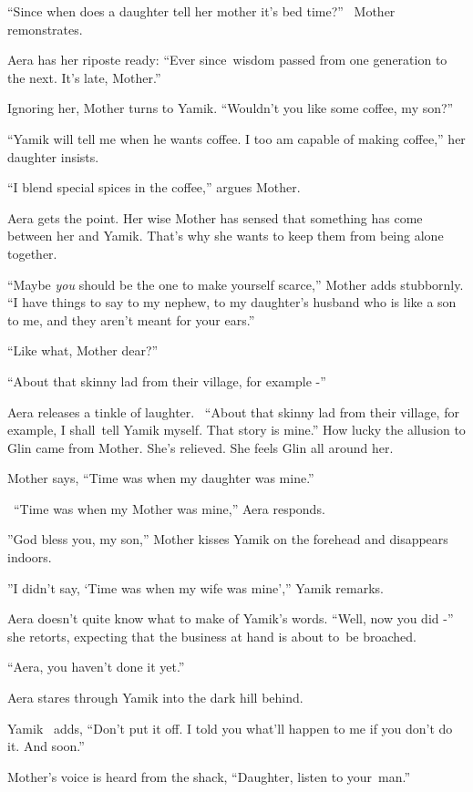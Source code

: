 \documentclass[letterpaper]{article}
\begin{document}
{}``Since when does a daughter tell her mother it's bed time?'' \ Mother remonstrates.

Aera has her riposte ready: ``Ever since~wisdom passed from one generation to the next. It's late, Mother.'' 

Ignoring her, Mother turns to Yamik. ``Wouldn't you like some coffee, my son?'' 

{}``Yamik will tell me when he wants coffee. I too am capable of making coffee,'' her daughter insists.

{}``I blend special spices in the coffee,'' argues Mother. 

Aera gets the point. Her wise Mother has sensed that something has come between her and Yamik. That's why she wants to
keep them from being alone together. 

{}``Maybe \textit{you} should be the one to make yourself scarce,'' Mother adds stubbornly. ``I have things to say to my
nephew, to my daughter's husband who is like a son to me, and they aren't meant for your ears.'' 

{}``Like what, Mother dear?'' 

{}``About that skinny\textcolor[rgb]{0.0,0.4392157,0.7529412}{ }lad from their village, for example -'' 

Aera releases a tinkle of laughter. ~``About that skinny lad from their village, for example, I shall~tell Yamik myself.
That story is mine.'' How lucky the allusion to Glin came from Mother. She's relieved. She feels Glin all around her. 

Mother says, ``Time was when my daughter was mine.'' 

\ {}``Time was when my Mother was mine,'' Aera responds.

{}''God bless you, my son,'' Mother kisses Yamik on the forehead and disappears indoors.

{}''I didn't say, `Time was when my wife was mine','' Yamik remarks.

Aera doesn't quite know what to make of Yamik's words. ``Well, now you did\textcolor[rgb]{0.0,0.4392157,0.7529412}{
-}{}'' she retorts, expecting that the business at hand is about to~be broached. 

{}``Aera, you haven't done it yet.''~ 

Aera stares through Yamik into the dark hill behind. 

Yamik \ adds, ``Don't put it off. I told you what'll happen to me if you don't do it. And soon.'' 

Mother's voice is heard from the shack, ``Daughter, listen to your~man.'' 
\end{document}
